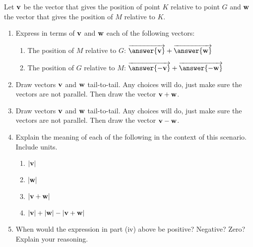 \documentclass{ximera}
\begin{document}
\begin{question}  \label{Q543:Vectors}
Let ${\bf v}$ be the vector that gives the position of point $K$ relative to point $G$ and ${\bf w}$ the vector that gives the position of $M$ relative to $K$. 

\begin{enumerate}

\item Express in terms of ${\bf v}$ and ${\bf w}$ each of the following vectors: 

\begin{enumerate}

\item The position of $M$ relative to $G$:  $\overrightarrow{\bf \answer{v}} +  \overrightarrow{\bf \answer{w}} $

\item The position of $G$ relative to $M$:  $\overrightarrow{\bf \answer{-v}} +  \overrightarrow{\bf \answer{-w}} $

\end{enumerate}

\item Draw vectors ${\bf v}$ and ${\bf w}$ tail-to-tail. Any choices will do, just make sure the vectors are not parallel. Then draw the vector ${\bf v} + {\bf w}$.

\item Draw vectors ${\bf v}$ and ${\bf w}$ tail-to-tail. Any choices will do, just make sure the vectors are not parallel. Then draw the vector ${\bf v} - {\bf w}$.

\item Explain the meaning of each of the following in the context of this scenario. Include units. 

\begin{enumerate}

\item $|  {\bf v} |$

\item $|  {\bf w} |$

\item $|  {\bf v+w} |$

\item $|  {\bf v} | + |  {\bf w} | - |  {\bf v+w} |$

\end{enumerate}

\item When would the expression in part (iv) above be positive? Negative? Zero? Explain your reasoning. 

\end{enumerate}

\end{question}
\end{document}
